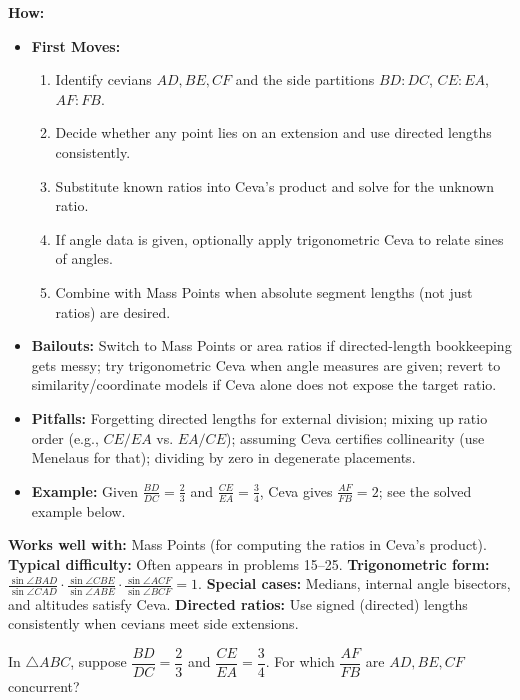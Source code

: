\documentclass[12pt]{article}
\newenvironment{problem}[1]
{\begin{tcolorbox}[colback=blue!5!white,colframe=blue!75!black,title={#1}]}{\end{tcolorbox}}
\begin{document}
\textbf{How:}
\begin{itemize}
    \item \textbf{First Moves:}
    \begin{enumerate}[nosep]
        \item Identify cevians $AD, BE, CF$ and the side partitions $BD:DC$, $CE:EA$, $AF:FB$.
        \item Decide whether any point lies on an extension and use directed lengths consistently.
        \item Substitute known ratios into Ceva's product and solve for the unknown ratio.
        \item If angle data is given, optionally apply trigonometric Ceva to relate sines of angles.
        \item Combine with Mass Points when absolute segment lengths (not just ratios) are desired.
    \end{enumerate}
    \item \textbf{Bailouts:} Switch to Mass Points or area ratios if directed-length bookkeeping gets messy; try trigonometric Ceva when angle measures are given; revert to similarity/coordinate models if Ceva alone does not expose the target ratio.
    \item \textbf{Pitfalls:} Forgetting directed lengths for external division; mixing up ratio order (e.g., $CE/EA$ vs. $EA/CE$); assuming Ceva certifies collinearity (use Menelaus for that); dividing by zero in degenerate placements.
    \item \textbf{Example:} Given $\tfrac{BD}{DC}=\tfrac{2}{3}$ and $\tfrac{CE}{EA}=\tfrac{3}{4}$, Ceva gives $\tfrac{AF}{FB}=2$; see the solved example below.
\end{itemize}
\textbf{Works well with:} Mass Points (for computing the ratios in Ceva's product).
\textbf{Typical difficulty:} Often appears in problems 15--25.
\textbf{Trigonometric form:} $\displaystyle \frac{\sin \angle BAD}{\sin \angle CAD} \cdot \frac{\sin \angle CBE}{\sin \angle ABE} \cdot \frac{\sin \angle ACF}{\sin \angle BCF} = 1$.
\textbf{Special cases:} Medians, internal angle bisectors, and altitudes satisfy Ceva.
\textbf{Directed ratios:} Use signed (directed) lengths consistently when cevians meet side extensions.

\begin{problem}{Example: Solve for a Missing Ratio}
In $\triangle ABC$, suppose $\dfrac{BD}{DC} = \dfrac{2}{3}$ and $\dfrac{CE}{EA} = \dfrac{3}{4}$. For which $\dfrac{AF}{FB}$ are $AD, BE, CF$ concurrent?
\end{problem}
\end{document}
